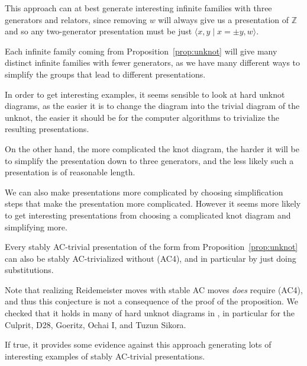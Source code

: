\begin{remark}
This approach can at best generate interesting infinite families with three generators and relators, since removing $w$ will always give us a presentation of $\mathbb{Z}$ and so any two-generator presentation must be just $\langle x,y \mid x=\pm y, w\rangle$.
\end{remark}
\begin{remark}
    Each infinite family coming from Proposition~\ref{prop:unknot} will give many distinct infinite families with fewer generators, as we have many different ways to simplify the groups that lead to different presentations.
\end{remark}
\begin{remark}
    In order to get interesting examples, it seems sensible to look at hard unknot diagrams, as the easier it is to change the diagram into the trivial diagram of the unknot, the easier it should be for the computer algorithms to trivialize the resulting presentations.
\end{remark}
\begin{remark}
    On the other hand, the more complicated the knot diagram, the harder it will be to simplify the presentation down to three generators, and the less likely such a presentation is of reasonable length.
\end{remark}
\begin{remark}
    We can also make presentations more complicated by choosing simplification steps that make the presentation more complicated. However it seems more likely to get interesting presentations from choosing a complicated knot diagram and simplifying more.
\end{remark}

\begin{conjecture}
    Every stably AC-trivial presentation of the form from Proposition~\ref{prop:unknot} can also be stably AC-trivialized without (AC4), and in particular by just doing substitutions.
\end{conjecture}

Note that realizing Reidemeister moves with stable AC moves \emph{does} require (AC4), and thus this conjecture is not a consequence of the proof of the proposition. We checked that it holds in many of hard unknot diagrams in \cite{burton2021harddiagramsunknot}, in particular for the Culprit, D28, Goeritz, Ochai I, and Tuzun Sikora.

If true, it provides some evidence against this approach generating lots of interesting examples of stably AC-trivial presentations.

